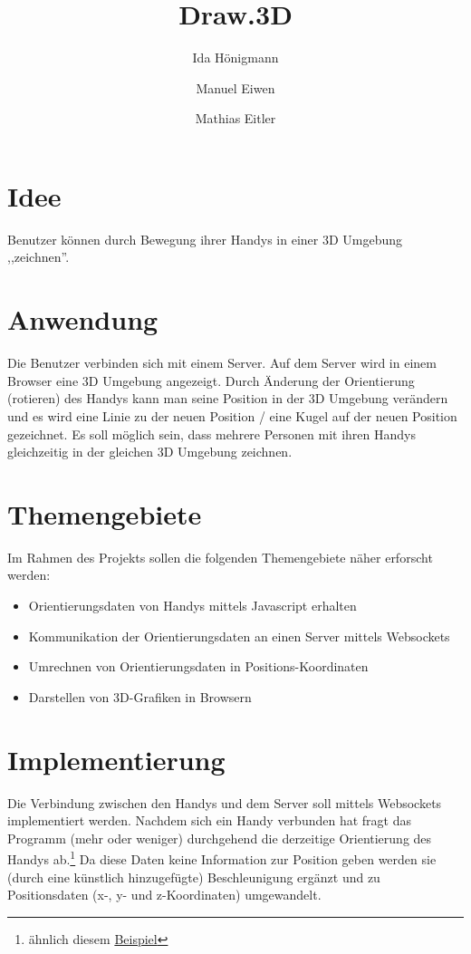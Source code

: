 ﻿\documentclass[]{article}
\title{Draw.3D}
\author{Ida Hönigmann \and Manuel Eiwen \and Mathias Eitler}
\begin{document}
\maketitle

\section*{Idee}
Benutzer können durch Bewegung ihrer Handys in einer 3D Umgebung ,,zeichnen''.

\section*{Anwendung}
Die Benutzer verbinden sich mit einem Server. Auf dem Server wird in einem Browser eine 3D Umgebung angezeigt. Durch Änderung der Orientierung (rotieren) des Handys kann man seine Position in der 3D Umgebung verändern und es wird eine Linie zu der neuen Position / eine Kugel auf der neuen Position gezeichnet.
Es soll möglich sein, dass mehrere Personen mit ihren Handys gleichzeitig in der gleichen 3D Umgebung zeichnen.

\section*{Themengebiete}
Im Rahmen des Projekts sollen die folgenden Themengebiete näher erforscht werden:
\begin{itemize}[noitemsep,topsep=4pt]
	\item Orientierungsdaten von Handys mittels Javascript erhalten
	\item Kommunikation der Orientierungsdaten an einen Server mittels Websockets
	\item Umrechnen von Orientierungsdaten in Positions-Koordinaten
	\item Darstellen von 3D-Grafiken in Browsern
\end{itemize}

\section*{Implementierung}
Die Verbindung zwischen den Handys und dem Server soll mittels Websockets implementiert werden. Nachdem sich ein Handy verbunden hat fragt das Programm (mehr oder weniger) durchgehend die derzeitige Orientierung des Handys ab.\footnote{ähnlich diesem \href{https://developer.mozilla.org/en-US/docs/Web/API/Detecting\_device\_orientation}{Beispiel}} Da diese Daten keine Information zur Position geben werden sie (durch eine künstlich hinzugefügte) Beschleunigung ergänzt und zu Positionsdaten (x-, y- und z-Koordinaten) umgewandelt.
\end{document}
